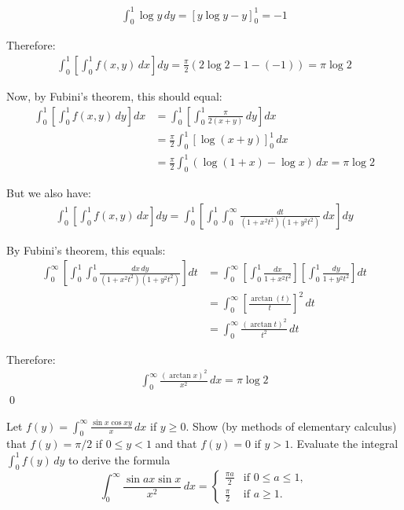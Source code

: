 \begin{align*}
\int_{0}^{1} \log y \, dy = \left[y \log y - y\right]_{0}^{1} = -1
\end{align*}

Therefore:
\begin{align*}
\int_{0}^{1} \left[ \int_{0}^{1} f(x, y) \, dx \right] dy = \frac{\pi}{2} (2 \log 2 - 1 - (-1)) = \pi \log 2
\end{align*}

Now, by Fubini's theorem, this should equal:
\begin{align*}
\int_{0}^{1} \left[ \int_{0}^{1} f(x, y) \, dy \right] dx &= \int_{0}^{1} \left[ \int_{0}^{1} \frac{\pi}{2(x + y)} \, dy \right] dx \\
&= \frac{\pi}{2} \int_{0}^{1} \left[ \log(x + y) \right]_{0}^{1} \, dx \\
&= \frac{\pi}{2} \int_{0}^{1} (\log(1 + x) - \log x) \, dx = \pi \log 2
\end{align*}

But we also have:
\begin{align*}
\int_{0}^{1} \left[ \int_{0}^{1} f(x, y) \, dx \right] dy = \int_{0}^{1} \left[ \int_{0}^{1} \int_{0}^{\infty} \frac{dt}{(1 + x^{2}t^{2})(1 + y^{2}t^{2})} \, dx \right] dy
\end{align*}

By Fubini's theorem, this equals:
\begin{align*}
\int_{0}^{\infty} \left[ \int_{0}^{1} \int_{0}^{1} \frac{dx \, dy}{(1 + x^{2}t^{2})(1 + y^{2}t^{2})} \right] dt &= \int_{0}^{\infty} \left[ \int_{0}^{1} \frac{dx}{1 + x^{2}t^{2}} \right] \left[ \int_{0}^{1} \frac{dy}{1 + y^{2}t^{2}} \right] dt \\
&= \int_{0}^{\infty} \left[ \frac{\arctan(t)}{t} \right]^{2} \, dt \\
&= \int_{0}^{\infty} \frac{(\arctan t)^{2}}{t^{2}} \, dt
\end{align*}

Therefore:
\begin{align*}
\int_{0}^{\infty} \frac{(\arctan x)^{2}}{x^{2}} \, dx = \pi \log 2
\end{align*}\qed


\begin{problembox}
Let $f(y) = \int_{0}^{\infty} \frac{\sin x \cos xy}{x} \, dx$ if $y \geq 0$. Show (by methods of elementary calculus) that $f(y) = \pi/2$ if $0 \leq y < 1$ and that $f(y) = 0$ if $y > 1$. Evaluate the integral $\int_{0}^{1} f(y) \, dy$ to derive the formula
\[\int_{0}^{\infty} \frac{\sin ax \sin x}{x^{2}} \, dx = \begin{cases} 
\frac{\pi a}{2} & \text{if } 0 \leq a \leq 1, \\
\frac{\pi}{2} & \text{if } a \geq 1.
\end{cases}\]
\end{problembox}

